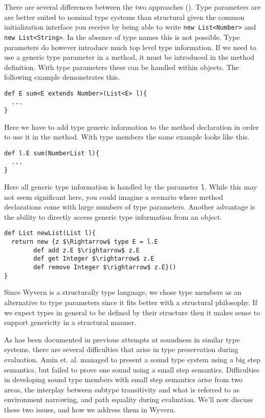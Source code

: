 \documentclass{llncs}
\numberwithin{subcase}{casethm}
\numberwithin{casethm}{theorem}
\numberwithin{casethm}{lemma}
\begin{document}
There are several differences between the two approaches 
(\cite{1999 virtual types}). Type parameters are are 
better suited to nominal type systems than structural 
given the common initialization interface you receive 
by being able to write \texttt{new List<Number>} and 
\texttt{new List<String>}. In the absence of type names 
this is not possible. Type parameters do however introduce 
much top level type information. If we need to use a
generic type parameter in a method, it must be introduced 
in the method definition. With type parameters these can be 
handled within objects. The following example demonstrates this.
\begin{lstlisting}[mathescape, style=custom_lang]
def E sum<E extends Number>(List<E> l){
  ...
}
\end{lstlisting}
Here we have to add type generic information to the method 
declaration in order to use it in the method. With type 
members the same example looks like this.
\begin{lstlisting}[mathescape, style=custom_lang]
def l.E sum(NumberList l){
  ...
}
\end{lstlisting}
Here all generic type information is handled by the parameter 
\texttt{l}. While this may not seem significant here, you could 
imagine a scenario where method declarations come with large numbers
of type parameters. Another advantage is the ability to directly 
access generic type information from an object.
\begin{lstlisting}[mathescape, style=custom_lang]
def List newList(List l){
  return new {z $\Rightarrow$ type E = l.E
		def add z.E $\rightarrow$ z.E
		def get Integer $\rightarrow$ z.E
		def remove Integer $\rightarrow$ z.E}()
}
\end{lstlisting}
Since Wyvern is a structurally type language, we 
chose type members as an alternative to type parameters 
since it fits better with a structural philosophy. 
If we expect types in general to be defined by their 
structure then it makes sense to support genericity 
in a structural manner.

As has been documented in previous attempts at soundness 
in similar type systems, there are several difficulties that 
arise in type preservation during evaluation. Amin et. al. \cite{Amin and co} 
managed to present a sound type system using a big step semantics, 
but failed to prove one sound using a small step semantics.
Difficulties in developing sound type members 
with small step semantics arise from 
two areas, the interplay between subtype transitivity and 
what is referred to as environment narrowing, and 
path equality during evaluation. We'll now
discuss these two issues, and how we address them in 
Wyvern.
\end{document}

